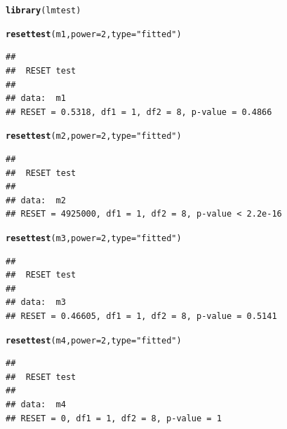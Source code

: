 \documentclass{article}\usepackage[]{graphicx}\usepackage[]{color}
\makeatletter
\newcommand{\hlnum}[1]{\textcolor[rgb]{0.686,0.059,0.569}{#1}}%
\newcommand{\hlstr}[1]{\textcolor[rgb]{0.192,0.494,0.8}{#1}}%
\newcommand{\hlstd}[1]{\textcolor[rgb]{0.345,0.345,0.345}{#1}}%
\newcommand{\hlkwc}[1]{\textcolor[rgb]{0.333,0.667,0.333}{#1}}%
\newcommand{\hlkwd}[1]{\textcolor[rgb]{0.737,0.353,0.396}{\textbf{#1}}}%
\newenvironment{kframe}{%
 \def\at@end@of@kframe{}%
 \ifinner\ifhmode%
  \def\at@end@of@kframe{\end{minipage}}%
  \begin{minipage}{\columnwidth}%
 \fi\fi%
 \def\FrameCommand##1{\hskip\@totalleftmargin \hskip-\fboxsep
 \colorbox{shadecolor}{##1}\hskip-\fboxsep
     \hskip-\linewidth \hskip-\@totalleftmargin \hskip\columnwidth}%
 \MakeFramed {\advance\hsize-\width
   \@totalleftmargin\z@ \linewidth\hsize
   \@setminipage}}%
 {\par\unskip\endMakeFramed%
 \at@end@of@kframe}
\newenvironment{knitrout}{}{} %
\makeatother
\begin{document}
\begin{knitrout}
\color{fgcolor}\begin{kframe}
\begin{alltt}
\hlkwd{library}\hlstd{(lmtest)}
\end{alltt}


{\ttfamily\noindent\itshape\color{messagecolor}{\#\# Loading required package: zoo}}

{\ttfamily\noindent\itshape\color{messagecolor}{\#\# \\\#\# Attaching package: 'zoo'}}

{\ttfamily\noindent\itshape\color{messagecolor}{\#\# The following objects are masked from 'package:base':\\\#\# \\\#\#\ \ \ \  as.Date, as.Date.numeric}}\begin{alltt}
\hlkwd{resettest}\hlstd{(m1,} \hlkwc{power} \hlstd{=} \hlnum{2}\hlstd{,} \hlkwc{type} \hlstd{=} \hlstr{"fitted"}\hlstd{)}
\end{alltt}
\begin{verbatim}
## 
## 	RESET test
## 
## data:  m1
## RESET = 0.5318, df1 = 1, df2 = 8, p-value = 0.4866
\end{verbatim}
\begin{alltt}
\hlkwd{resettest}\hlstd{(m2,} \hlkwc{power} \hlstd{=} \hlnum{2}\hlstd{,} \hlkwc{type} \hlstd{=} \hlstr{"fitted"}\hlstd{)}
\end{alltt}
\begin{verbatim}
## 
## 	RESET test
## 
## data:  m2
## RESET = 4925000, df1 = 1, df2 = 8, p-value < 2.2e-16
\end{verbatim}
\begin{alltt}
\hlkwd{resettest}\hlstd{(m3,} \hlkwc{power} \hlstd{=} \hlnum{2}\hlstd{,} \hlkwc{type} \hlstd{=} \hlstr{"fitted"}\hlstd{)}
\end{alltt}
\begin{verbatim}
## 
## 	RESET test
## 
## data:  m3
## RESET = 0.46605, df1 = 1, df2 = 8, p-value = 0.5141
\end{verbatim}
\begin{alltt}
\hlkwd{resettest}\hlstd{(m4,} \hlkwc{power} \hlstd{=} \hlnum{2}\hlstd{,} \hlkwc{type} \hlstd{=} \hlstr{"fitted"}\hlstd{)}
\end{alltt}
\begin{verbatim}
## 
## 	RESET test
## 
## data:  m4
## RESET = 0, df1 = 1, df2 = 8, p-value = 1
\end{verbatim}
\end{kframe}
\end{knitrout}
\end{document}
